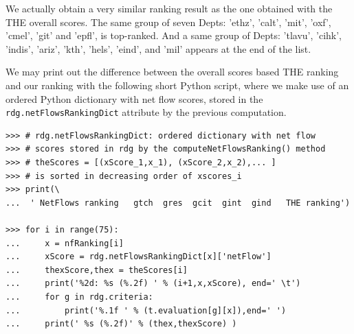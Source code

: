  We actually obtain a very similar ranking result as the one obtained with the THE overall scores. The same group of seven Depts: 'ethz', 'calt', 'mit', 'oxf', 'cmel', 'git' and 'epfl', is top-ranked. And a same group of Depts: 'tlavu', 'cihk', 'indis', 'ariz', 'kth', 'hels', 'eind', and 'mil' appears at the end of the list.

We may print out the difference between the overall scores based THE ranking and our \NetFlows ranking with the following short Python script, where we make use of an ordered Python dictionary with net flow scores, stored in the \texttt{rdg.netFlowsRankingDict} attribute by the previous computation.

\begin{lstlisting}[caption={Comparing the robust \NetFlows ranking with the THE ranking},label=list:13.10]
>>> # rdg.netFlowsRankingDict: ordered dictionary with net flow
>>> # scores stored in rdg by the computeNetFlowsRanking() method
>>> # theScores = [(xScore_1,x_1), (xScore_2,x_2),... ]
>>> # is sorted in decreasing order of xscores_i
>>> print(\
...  ' NetFlows ranking   gtch  gres  gcit  gint  gind   THE ranking')
   
>>> for i in range(75):
...     x = nfRanking[i]
...     xScore = rdg.netFlowsRankingDict[x]['netFlow']
...     thexScore,thex = theScores[i]
...     print('%2d: %s (%.2f) ' % (i+1,x,xScore), end=' \t')
...     for g in rdg.criteria:
...         print('%.1f ' % (t.evaluation[g][x]),end=' ')
...     print(' %s (%.2f)' % (thex,thexScore) )
   

\end{lstlisting}
